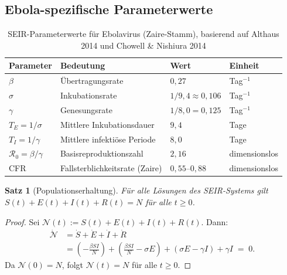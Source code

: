 ﻿\documentclass[12pt,a4paper]{article}
\theoremstyle{definition}
\theoremstyle{plain}
\newtheorem{satz}[definition]{Satz}
\theoremstyle{remark}
\begin{document}
\subsection{Ebola-spezifische Parameterwerte}

\begin{table}[H]
\centering
\caption{SEIR-Parameterwerte für Ebolavirus (Zaire-Stamm), basierend auf
Althaus 2014 \cite{althaus2014} und Chowell \& Nishiura 2014 \cite{chowell2014}}
\label{tab:params}
\begin{tabularx}{\textwidth}{lXll}
\toprule
Parameter & Bedeutung & Wert & Einheit \\
\midrule
$\beta$ & Übertragungsrate & $0{,}27$ & Tag$^{-1}$ \\
$\sigma$ & Inkubationsrate & $1/9{,}4 \approx 0{,}106$ & Tag$^{-1}$ \\
$\gamma$ & Genesungsrate & $1/8{,}0 = 0{,}125$ & Tag$^{-1}$ \\
$T_E = 1/\sigma$ & Mittlere Inkubationsdauer & $9{,}4$ & Tage \\
$T_I = 1/\gamma$ & Mittlere infektiöse Periode & $8{,}0$ & Tage \\
$\mathcal{R}_0 = \beta/\gamma$ & Basisreproduktionszahl & $2{,}16$ & dimensionslos \\
CFR & Fallsterblichkeitsrate (Zaire) & $0{,}55$--$0{,}88$ & dimensionslos \\
\bottomrule
\end{tabularx}
\end{table}

\begin{satz}[Populationserhaltung]
Für alle Lösungen des SEIR-Systems gilt $S(t) + E(t) + I(t) + R(t) = N$ für alle $t \geq 0$.
\end{satz}

\begin{proof}
Sei $\mathcal{N}(t) := S(t) + E(t) + I(t) + R(t)$. Dann:
\begin{align*}
  \dot{\mathcal{N}} &= \dot{S} + \dot{E} + \dot{I} + \dot{R} \\
  &= \left(-\tfrac{\beta SI}{N}\right)
     + \left(\tfrac{\beta SI}{N} - \sigma E\right)
     + \left(\sigma E - \gamma I\right)
     + \gamma I \;=\; 0.
\end{align*}
Da $\mathcal{N}(0) = N$, folgt $\mathcal{N}(t) = N$ für alle $t \geq 0$.
\end{proof}
\end{document}
